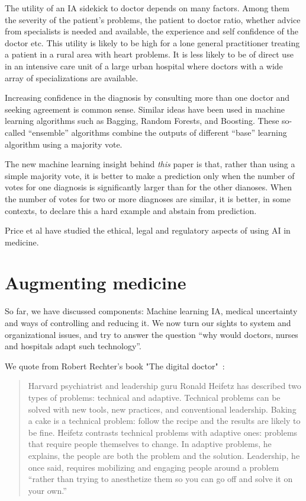 \documentclass[11pt]{pnas-new}
\begin{document}
The utility of an IA sidekick to doctor depends on many factors. Among
them the severity of the patient's problems, the patient to doctor
ratio, whether advice from specialists is needed and available, the
experience and self confidence of the doctor etc. This utility is
likely to be high for a lone general practitioner treating a patient
in a rural area with heart problems. It is less likely to be of direct
use in an intensive care unit of a large urban hospital where doctors
with a wide array of specializations are available.

Increasing confidence in the diagnosis by consulting more than one
doctor and seeking agreement is common sense. Similar ideas have been
used in machine learning algorithms such as Bagging, Random Forests, and
Boosting. These so-called ``ensemble'' algorithms combine the outputs
of different ``base'' learning algorithm using a majority vote.

The new machine learning insight behind {\em this} paper is that, rather than
using a simple majority vote, it is better to make a prediction only when the
number of votes for one diagnosis is significantly larger than for the
other dianoses. When the number of votes for two or more diagnoses are
similar, it is better, in some contexts, to declare this a hard
example and abstain from prediction.

Price et al have studied the ethical, legal and regulatory
aspects of using AI in medicine.\cite{price2014black,ford2016privacy, ford2017regulating}


\section{Augmenting medicine}

So far, we have discussed components: Machine learning IA, medical
uncertainty and ways of controlling and reducing it. We now turn our
sights to system and organizational issues, and try to answer the
question ``why would doctors, nurses and hospitals adapt such technology''.

We quote from Robert Rechter's book "The digital doctor"~\cite{wachter2015digital}:
\begin{quote}
  Harvard psychiatrist and leadership guru Ronald Heifetz has
  described two types of problems: technical and adaptive. Technical
  problems can be solved with new tools, new practices, and
  conventional leadership. Baking a cake is a technical problem:
  follow the recipe and the results are likely to be fine. Heifetz
  contrasts technical problems with adaptive ones: problems that
  require people themselves to change. In adaptive problems, he
  explains, the people are both the problem and the
  solution. Leadership, he once said, requires mobilizing and engaging
  people around a problem “rather than trying to anesthetize them so
  you can go off and solve it on your own.”
\end{quote}
\end{document}
